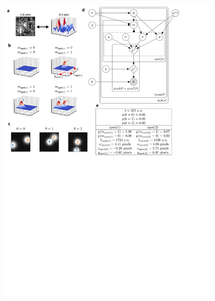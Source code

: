 \begin{figure}[t]
\centering
\includegraphics[width=183mm]{figures/figure2/figure2.png}

\end{figure}
